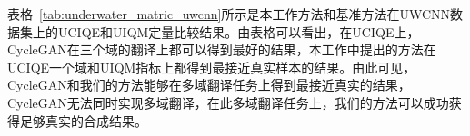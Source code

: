 表格~\ref{tab:underwater_matric_uwcnn}所示是本工作方法和基准方法在UWCNN数据集上的UCIQE和UIQM定量比较结果。由表格可以看出，在UCIQE上，CycleGAN在三个域的翻译上都可以得到最好的结果，本工作中提出的方法在UCIQE一个域和UIQM指标上都得到最接近真实样本的结果。由此可见，CycleGAN和我们的方法能够在多域翻译任务上得到最接近真实的结果，CycleGAN无法同时实现多域翻译，在此多域翻译任务上，我们的方法可以成功获得足够真实的合成结果。
